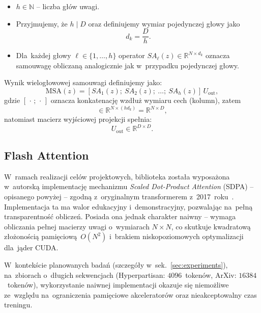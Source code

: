 \documentclass[a4paper,11pt,twoside]{report}
\theoremstyle{definition}
\begin{document}
\begin{itemize}
  \item $h \in \mathbb{N}$ -- liczba głów uwagi.
  \item Przyjmujemy, że $h \mid D$ oraz definiujemy wymiar pojedynczej głowy jako
  \begin{equation}
  d_k = \frac{D}{h}.
  \end{equation}
  \item Dla~każdej głowy $\ell \in \{1,\dots,h\}$ operator $SA_\ell(z)\in\mathbb{R}^{N\times d_k}$ oznacza samouwagę obliczaną analogicznie jak w~przypadku pojedynczej głowy.
\end{itemize}


Wynik wielogłowowej samouwagi definiujemy jako:
\begin{equation}
\mathrm{MSA}(z) = [SA_1(z);\ SA_2(z);\ \dots;\ SA_h(z)]\, U_{\mathrm{out}},
\end{equation}
gdzie $[\,\cdot\,;\,\cdot\,]$ oznacza konkatenację wzdłuż wymiaru cech (kolumn), zatem
\begin{equation}
[SA_1(z);\dots;SA_h(z)] \in \mathbb{R}^{N \times (h d_k)} = \mathbb{R}^{N \times D},
\end{equation}
natomiast macierz wyjściowej projekcji spełnia:
\begin{equation}
U_{\mathrm{out}} \in \mathbb{R}^{D \times D}.
\end{equation}



\subsection{Flash Attention}\label{sec:flash-attention}

W~ramach realizacji celów projektowych, biblioteka została wyposażona w~autorską implementację mechanizmu \textit{Scaled Dot-Product Attention} (SDPA) -- opisanego powyżej -- zgodną z~oryginalnym transformerem z~2017~roku~\cite{vaswani2017attention}. Implementacja ta ma walor edukacyjny i~demonstracyjny, pozwalając na~pełną transparentność obliczeń. Posiada ona jednak charakter naiwny -- wymaga obliczania pełnej macierzy uwagi o~wymiarach $N \times N$, co skutkuje kwadratową złożonością pamięciową~$O(N^2)$ i~brakiem niskopoziomowych optymalizacji dla~jąder CUDA.
 
W~kontekście planowanych badań (szczegóły w~sek.~\ref{sec:experiments}), na~zbiorach o~długich sekwencjach (Hyperpartisan: $4096$~tokenów, ArXiv: $16384$~tokenów), wykorzystanie naiwnej implementacji okazuje się niemożliwe ze~względu na~ograniczenia pamięciowe akceleratorów oraz nieakceptowalny czas treningu.
\end{document}
